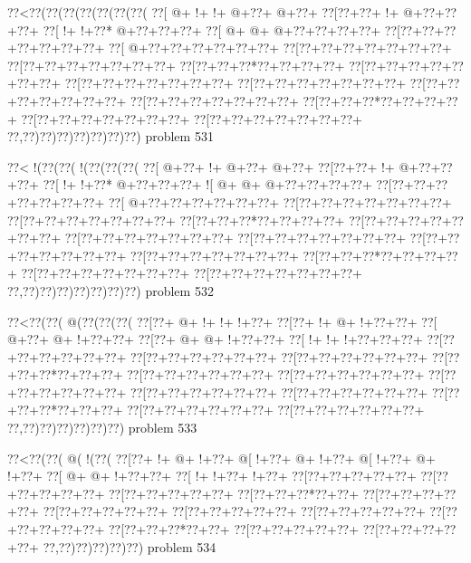 \vbox{\vbox{\goo
\0??<\0??(\0??(\0??(\0??(\0??(\0??(\0??(
\0??[\- @+\- !+\- !+\- @+\0??+\- @+\0??+
\0??[\0??+\0??+\- !+\- @+\0??+\0??+\0??+
\0??[\- !+\- !+\0??*\- @+\0??+\0??+\0??+
\0??[\- @+\- @+\- @+\0??+\0??+\0??+\0??+
\0??[\0??+\0??+\0??+\0??+\0??+\0??+\0??+
\0??[\- @+\0??+\0??+\0??+\0??+\0??+\0??+
\0??[\0??+\0??+\0??+\0??+\0??+\0??+\0??+
\0??[\0??+\0??+\0??+\0??+\0??+\0??+\0??+
\0??[\0??+\0??+\0??*\0??+\0??+\0??+\0??+
\0??[\0??+\0??+\0??+\0??+\0??+\0??+\0??+
\0??[\0??+\0??+\0??+\0??+\0??+\0??+\0??+
\0??[\0??+\0??+\0??+\0??+\0??+\0??+\0??+
\0??[\0??+\0??+\0??+\0??+\0??+\0??+\0??+
\0??[\0??+\0??+\0??+\0??+\0??+\0??+\0??+
\0??[\0??+\0??+\0??*\0??+\0??+\0??+\0??+
\0??[\0??+\0??+\0??+\0??+\0??+\0??+\0??+
\0??[\0??+\0??+\0??+\0??+\0??+\0??+\0??+
\0??,\0??)\0??)\0??)\0??)\0??)\0??)\0??)
}
\hfil problem 531\hfil\break
}

\vbox{\vbox{\goo
\0??<\- !(\0??(\0??(\- !(\0??(\0??(\0??(
\0??[\- @+\0??+\- !+\- @+\0??+\- @+\0??+
\0??[\0??+\0??+\- !+\- @+\0??+\0??+\0??+
\0??[\- !+\- !+\0??*\- @+\0??+\0??+\0??+
\- ![\- @+\- @+\- @+\0??+\0??+\0??+\0??+
\0??[\0??+\0??+\0??+\0??+\0??+\0??+\0??+
\0??[\- @+\0??+\0??+\0??+\0??+\0??+\0??+
\0??[\0??+\0??+\0??+\0??+\0??+\0??+\0??+
\0??[\0??+\0??+\0??+\0??+\0??+\0??+\0??+
\0??[\0??+\0??+\0??*\0??+\0??+\0??+\0??+
\0??[\0??+\0??+\0??+\0??+\0??+\0??+\0??+
\0??[\0??+\0??+\0??+\0??+\0??+\0??+\0??+
\0??[\0??+\0??+\0??+\0??+\0??+\0??+\0??+
\0??[\0??+\0??+\0??+\0??+\0??+\0??+\0??+
\0??[\0??+\0??+\0??+\0??+\0??+\0??+\0??+
\0??[\0??+\0??+\0??*\0??+\0??+\0??+\0??+
\0??[\0??+\0??+\0??+\0??+\0??+\0??+\0??+
\0??[\0??+\0??+\0??+\0??+\0??+\0??+\0??+
\0??,\0??)\0??)\0??)\0??)\0??)\0??)\0??)
}
\hfil problem 532\hfil\break
}

\vbox{\vbox{\goo
\0??<\0??(\0??(\- @(\0??(\0??(\0??(
\0??[\0??+\- @+\- !+\- !+\- !+\0??+
\0??[\0??+\- !+\- @+\- !+\0??+\0??+
\0??[\- @+\0??+\- @+\- !+\0??+\0??+
\0??[\0??+\- @+\- @+\- !+\0??+\0??+
\0??[\- !+\- !+\- !+\0??+\0??+\0??+
\0??[\0??+\0??+\0??+\0??+\0??+\0??+
\0??[\0??+\0??+\0??+\0??+\0??+\0??+
\0??[\0??+\0??+\0??+\0??+\0??+\0??+
\0??[\0??+\0??+\0??*\0??+\0??+\0??+
\0??[\0??+\0??+\0??+\0??+\0??+\0??+
\0??[\0??+\0??+\0??+\0??+\0??+\0??+
\0??[\0??+\0??+\0??+\0??+\0??+\0??+
\0??[\0??+\0??+\0??+\0??+\0??+\0??+
\0??[\0??+\0??+\0??+\0??+\0??+\0??+
\0??[\0??+\0??+\0??*\0??+\0??+\0??+
\0??[\0??+\0??+\0??+\0??+\0??+\0??+
\0??[\0??+\0??+\0??+\0??+\0??+\0??+
\0??,\0??)\0??)\0??)\0??)\0??)\0??)
}
\hfil problem 533\hfil\break
}

\vbox{\vbox{\goo
\0??<\0??(\0??(\- @(\- !(\0??(
\0??[\0??+\- !+\- @+\- !+\0??+
\- @[\- !+\0??+\- @+\- !+\0??+
\- @[\- !+\0??+\- @+\- !+\0??+
\0??[\- @+\- @+\- !+\0??+\0??+
\0??[\- !+\- !+\0??+\- !+\0??+
\0??[\0??+\0??+\0??+\0??+\0??+
\0??[\0??+\0??+\0??+\0??+\0??+
\0??[\0??+\0??+\0??+\0??+\0??+
\0??[\0??+\0??+\0??*\0??+\0??+
\0??[\0??+\0??+\0??+\0??+\0??+
\0??[\0??+\0??+\0??+\0??+\0??+
\0??[\0??+\0??+\0??+\0??+\0??+
\0??[\0??+\0??+\0??+\0??+\0??+
\0??[\0??+\0??+\0??+\0??+\0??+
\0??[\0??+\0??+\0??*\0??+\0??+
\0??[\0??+\0??+\0??+\0??+\0??+
\0??[\0??+\0??+\0??+\0??+\0??+
\0??,\0??)\0??)\0??)\0??)\0??)
}
\hfil problem 534\hfil\break
}

